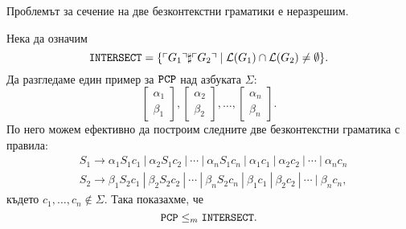 \begin{corollary}\label{cor:pcp:grammar-intersect}
  Проблемът за сечение на две безконтекстни граматики е неразрешим.
\end{corollary}
\begin{hint}
  Нека да означим
  \[\texttt{INTERSECT} = \{\ulcorner{G_1}\urcorner\sharp\ulcorner{G_2}\urcorner \mid \mathcal{L}(G_1) \cap \mathcal{L}(G_2) \neq \emptyset \}.\]
  Да разгледаме един пример за $\texttt{PCP}$ над азбуката $\Sigma$:
  \[\begin{bmatrix} \alpha_1\\ \beta_1\end{bmatrix},\begin{bmatrix} \alpha_2\\ \beta_2\end{bmatrix},\dots,\begin{bmatrix} \alpha_n\\ \beta_n\end{bmatrix}.\]
  По него можем ефективно да построим следните две безконтекстни граматика с правила:
  \begin{align*}
    & S_1 \to \alpha_1S_1 c_1\ |\ \alpha_2 S_1 c_2\ |\ \cdots\ |\ \alpha_n S_1 c_n\ |\ \alpha_1c_1\ |\ \alpha_2c_2\ |\ \cdots\ |\ \alpha_nc_n\\
    & S_2 \to \beta_1S_2 c_1\ |\ \beta_2 S_2 c_2\ |\ \cdots\ |\ \beta_n S_2 c_n\ |\ \beta_1c_1\ |\ \beta_2c_2\ |\ \cdots\ |\ \beta_nc_n,
  \end{align*}
  където $c_1,\dots,c_n \not \in \Sigma$.
  Така показахме, че
  \[\texttt{PCP} \leq_m \texttt{INTERSECT}.\]
\end{hint}



